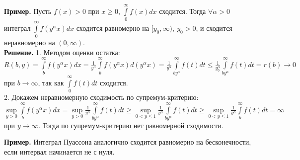 \textbf{Пример.} Пусть $f(x)>0$ при  $x\geqslant 0$,
$\int\limits_{0}^{\infty} f(x)dx$ сходится.
Тогда $\forall \alpha>0$ интеграл $\int\limits_{0}^{\infty}f(y^\alpha x)dx$
сходится равномерно на $[y_0,\infty),~y_0>0$, и сходится неравномерно
на $(0,\infty)$.\\
\textbf{Решение.} 1. Методом оценки остатка: 
$R(b,y)=\int\limits_{b}^{\infty}f(y^\alpha x)dx=\frac{1}{y^\alpha}
\int\limits_{b}^{\infty} f(y^\alpha x)d(y^\alpha x)=\frac{1}{y^\alpha}
\int\limits_{by^\alpha}^{\infty}f(t)dt\leqslant \frac{1}{y^\alpha_0}
\int\limits_{by^\alpha}^{\infty} f(t)dt=r(b)\to 0$ при $b\to \infty$,
так как $\int\limits_{0}^{\infty} f(t)dt$ сходится.\\
2. Докажем неравномерную сходимость по супремум-критерию:
$\sup\limits_{y>0}\int\limits_{b}^{\infty} f(y^\alpha x)dx=
\sup\limits_{y>0}\frac{1}{y^\alpha}\int\limits_{by^\alpha}^{\infty} f(t)dt
\geqslant
\sup\limits_{0<y\leqslant 1}\frac{1}{y^\alpha}\int\limits_{by^\alpha}^{\infty}
f(t)dt\geqslant
\sup\limits_{0<y\leqslant 1}\frac{1}{y^\alpha}\int\limits_{b}^{\infty}f(t)dt=
\infty$ при $y\to \infty$. Тогда по супремум-критерию нет равномерной 
сходимости.

\textbf{Пример.} Интеграл Пуассона аналогично сходится равномерно на 
бесконечности, если интервал начинается не с нуля. 

